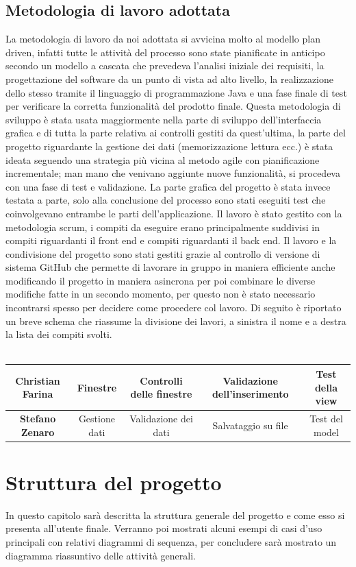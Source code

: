 \documentclass[ 4paper,11pt,openany]{book}
\begin{document}
 \section{Metodologia di lavoro adottata}
La metodologia di lavoro da noi adottata si avvicina molto al modello plan driven, infatti tutte le attività del processo sono state pianificate in anticipo secondo un modello a cascata che prevedeva l'analisi iniziale dei requisiti, la progettazione del software da un punto di vista ad alto livello, la realizzazione dello stesso tramite il linguaggio di programmazione Java e una fase finale di test per verificare la corretta funzionalità del prodotto finale.
Questa metodologia di sviluppo è stata usata maggiormente nella parte di sviluppo dell'interfaccia grafica e di tutta la parte relativa ai controlli gestiti da quest'ultima, la parte del progetto riguardante la gestione dei dati (memorizzazione lettura ecc.) è stata ideata seguendo una strategia più vicina al metodo agile con pianificazione incrementale; man mano che venivano aggiunte nuove funzionalità, si procedeva con una fase di test e validazione. La parte grafica del progetto è stata invece testata a parte, solo alla conclusione del processo sono stati eseguiti test che coinvolgevano entrambe le parti dell'applicazione. Il lavoro è stato gestito con la metodologia scrum, i compiti da eseguire erano principalmente suddivisi in compiti riguardanti il front end e compiti riguardanti il back end. Il lavoro e la condivisione del progetto sono stati gestiti grazie al controllo di versione di sistema GitHub che permette di lavorare in gruppo in maniera efficiente anche modificando il progetto in maniera asincrona per poi combinare le diverse modifiche fatte in un secondo momento, per questo non è stato necessario incontrarsi spesso per decidere come procedere col lavoro.  Di seguito è riportato un breve schema che riassume la divisione dei lavori, a sinistra il nome e a destra la lista dei compiti svolti.\\ \\
\begin{tabular}{|c|c|c|c|c|}
\hline
\textbf{Christian Farina} & Finestre & Controlli delle finestre & Validazione dell'inserimento & Test della view\\
\hline
\textbf{Stefano Zenaro} & Gestione dati & Validazione dei dati & Salvataggio su file & Test del model\\
\hline
\end{tabular}


\chapter{Struttura del progetto}
In questo capitolo sarà descritta la struttura generale del progetto e come esso si presenta all'utente finale. Verranno poi mostrati alcuni esempi di casi d'uso principali con relativi diagrammi di sequenza, per concludere sarà mostrato un diagramma riassuntivo delle attività generali.
\end{document}
